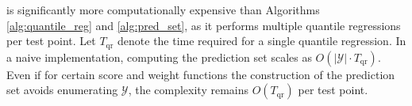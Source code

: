  is significantly more computationally expensive than Algorithms \ref{alg:quantile_reg} and \ref{alg:pred_set}, as it performs multiple quantile regressions per test point. Let  $T_{\text{qr}}$  denote the time required for a single quantile regression. In a naive implementation, computing the prediction set scales as  $O(|\mathcal{Y}| \cdot T_{\text{qr}})$. Even if for certain score and weight functions the construction of the prediction set avoids enumerating $\mathcal{Y}$, the complexity remains  $O(T_{\text{qr}})$ per test point.
